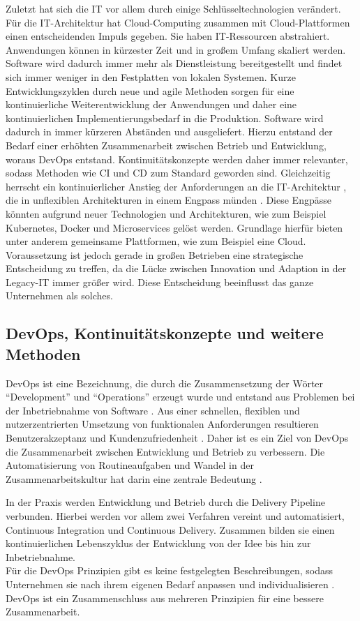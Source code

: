 Zuletzt hat sich die IT vor allem durch einige Schlüsseltechnologien verändert. Für die IT-Architektur hat Cloud-Computing zusammen mit Cloud-Plattformen einen entscheidenden Impuls gegeben. Sie haben IT-Ressourcen abstrahiert. Anwendungen können in kürzester Zeit und in großem Umfang skaliert werden. Software wird dadurch immer mehr als Dienstleistung bereitgestellt und findet sich immer weniger in den Festplatten von lokalen Systemen. Kurze Entwicklungszyklen durch neue und agile Methoden sorgen für eine kontinuierliche Weiterentwicklung der Anwendungen und daher eine kontinuierlichen Implementierungsbedarf in die Produktion. Software wird dadurch in immer kürzeren Abständen und ausgeliefert. Hierzu entstand der Bedarf einer erhöhten Zusammenarbeit zwischen Betrieb und Entwicklung, woraus DevOps entstand. Kontinuitätskonzepte werden daher immer relevanter, sodass Methoden wie \ac{CI} und \ac{CD} zum Standard geworden sind. Gleichzeitig herrscht ein kontinuierlicher Anstieg der Anforderungen an die IT-Architektur \cite{Bussmann2006}, die in unflexiblen Architekturen in einem Engpass münden \cite{Brockhoff2006, Bussmann2006}. Diese Engpässe könnten aufgrund neuer Technologien und Architekturen, wie zum Beispiel Kubernetes, Docker und Microservices gelöst werden. Grundlage hierfür bieten unter anderem gemeinsame Plattformen, wie zum Beispiel eine Cloud. Voraussetzung ist jedoch gerade in großen Betrieben eine strategische Entscheidung zu treffen, da die Lücke zwischen Innovation und Adaption in der Legacy-IT immer größer wird. Diese Entscheidung beeinflusst das ganze Unternehmen als solches.

\subsection{DevOps, Kontinuitätskonzepte und weitere Methoden}
DevOps ist eine Bezeichnung, die durch die Zusammensetzung der Wörter \enquote{Development} und \enquote{Operations} erzeugt wurde und entstand aus Problemen bei der Inbetriebnahme von Software \cite{mci/Disterer2011}. Aus einer schnellen, flexiblen und nutzerzentrierten Umsetzung von funktionalen Anforderungen resultieren Benutzerakzeptanz und Kundenzufriedenheit \cite{mci/Disterer2011, Alt2017}. Daher ist es ein Ziel von DevOps die Zusammenarbeit zwischen Entwicklung und Betrieb zu verbessern. Die Automatisierung von Routineaufgaben und Wandel in der Zusammenarbeitskultur hat darin eine zentrale Bedeutung \cite{Alt2017}. 

In der Praxis werden Entwicklung und Betrieb durch die Delivery Pipeline verbunden.
Hierbei werden vor allem zwei Verfahren vereint und automatisiert, Continuous Integration und Continuous Delivery. Zusammen bilden sie einen kontinuierlichen Lebenszyklus der Entwicklung von der Idee bis hin zur Inbetriebnahme.
\medskip
\\
Für die DevOps Prinzipien gibt es keine festgelegten Beschreibungen, sodass Unternehmen sie nach ihrem eigenen Bedarf anpassen und individualisieren \cite{Alt2017}. DevOps ist ein Zusammenschluss aus mehreren Prinzipien für eine bessere Zusammenarbeit.

